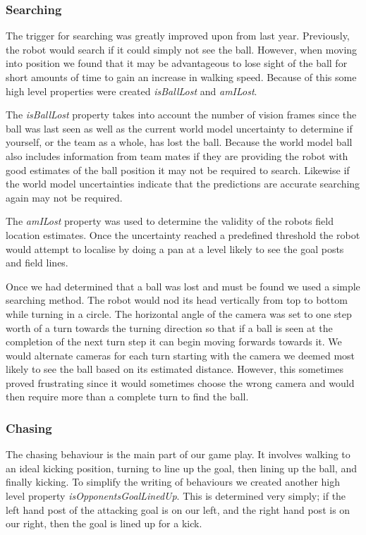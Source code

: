 \subsubsection{Searching}
The trigger for searching was greatly improved upon from last year. Previously, the robot would search if it could simply not see the ball. However, when moving into position we found that it may be advantageous to lose sight of the ball for short amounts of time to gain an increase in walking speed. Because of this some high level properties were created \emph{isBallLost} and \emph{amILost}. 

The \emph{isBallLost} property takes into account the number of vision frames since the ball was last seen as well as the current world model uncertainty to determine if yourself, or the team as a whole, has lost the ball. Because the world model ball also includes information from team mates if they are providing the robot with good estimates of the ball position it may not be required to search. Likewise if the world model uncertainties indicate that the predictions are accurate searching again may not be required. 

The \emph{amILost} property was used to determine the validity of the robots field location estimates. Once the uncertainty reached a predefined threshold the robot would attempt to localise by doing a pan at a level likely to see the goal posts and field lines.

Once we had determined that a ball was lost and must be found we used a simple searching method. The robot would nod its head vertically from top to bottom while turning in a circle. The horizontal angle of the camera was set to one step worth of a turn towards the turning direction so that if a ball is seen at the completion of the next turn step it can begin moving forwards towards it. We would alternate cameras for each turn starting with the camera we deemed most likely to see the ball based on its estimated distance. However, this sometimes proved frustrating since it would sometimes choose the wrong camera and would then require more than a complete turn to find the ball.


\subsubsection{Chasing}
The chasing behaviour is the main part of our game play. It involves walking to an ideal kicking position, turning to line up the goal, then lining up the ball, and finally kicking. To simplify the writing of behaviours we created another high level property \emph{isOpponentsGoalLinedUp}. This is determined very simply; if the left hand post of the attacking goal is on our left, and the right hand post is on our right, then the goal is lined up for a kick. 

